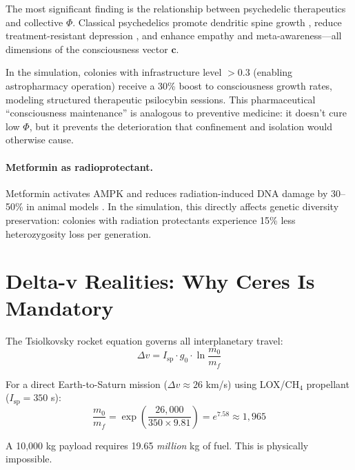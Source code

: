 \documentclass[12pt,a4paper]{article}
\begin{document}
The most significant finding is the relationship between psychedelic therapeutics and collective $\Phi$. Classical psychedelics promote dendritic spine growth \citep{shao2021psilocybin}, reduce treatment-resistant depression \citep{carhart2021trial}, and enhance empathy and meta-awareness---all dimensions of the consciousness vector $\mathbf{c}$.

In the simulation, colonies with infrastructure level $> 0.3$ (enabling astropharmacy operation) receive a 30\% boost to consciousness growth rates, modeling structured therapeutic psilocybin sessions. This pharmaceutical ``consciousness maintenance'' is analogous to preventive medicine: it doesn't cure low $\Phi$, but it prevents the deterioration that confinement and isolation would otherwise cause.

\paragraph{Metformin as radioprotectant.} Metformin activates AMPK and reduces radiation-induced DNA damage by 30--50\% in animal models \citep{steinberg2009ampk}. In the simulation, this directly affects genetic diversity preservation: colonies with radiation protectants experience 15\% less heterozygosity loss per generation.


\section{Delta-v Realities: Why Ceres Is Mandatory}
\label{sec:deltav}

The Tsiolkovsky rocket equation governs all interplanetary travel:
\begin{equation}
    \Delta v = I_\text{sp} \cdot g_0 \cdot \ln\frac{m_0}{m_f}
\end{equation}

For a direct Earth-to-Saturn mission ($\Delta v \approx 26$ km/s) using LOX/CH$_4$ propellant ($I_\text{sp} = 350$ s):
\begin{equation}
    \frac{m_0}{m_f} = \exp\left(\frac{26{,}000}{350 \times 9.81}\right) = e^{7.58} \approx 1{,}965
\end{equation}

A 10,000 kg payload requires 19.65 \emph{million} kg of fuel. This is physically impossible.
\end{document}
